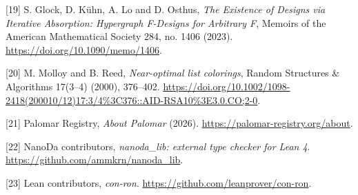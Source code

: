 \documentclass[english,11pt,a4paper]{article}
\begin{document}
{[}19{]} S. Glock, D. Kühn, A. Lo and D. Osthus, \emph{The Existence of Designs via Iterative Absorption: Hypergraph F-Designs for Arbitrary F}, Memoirs of the American Mathematical Society 284, no. 1406 (2023). \url{https://doi.org/10.1090/memo/1406}.

{[}20{]} M. Molloy and B. Reed, \emph{Near-optimal list colorings}, Random Structures \& Algorithms 17(3--4) (2000), 376--402. \url{https://doi.org/10.1002/1098-2418(200010/12)17:3/4\%3C376::AID-RSA10\%3E3.0.CO;2-0}.

{[}21{]} Palomar Registry, \emph{About Palomar} (2026). \url{https://palomar-registry.org/about}.

{[}22{]} NanoDa contributors, \emph{nanoda\_lib: external type checker for Lean 4}. \url{https://github.com/ammkrn/nanoda_lib}.

{[}23{]} Lean contributors, \emph{con-ron}. \url{https://github.com/leanprover/con-ron}.

\endgroup
\end{document}
